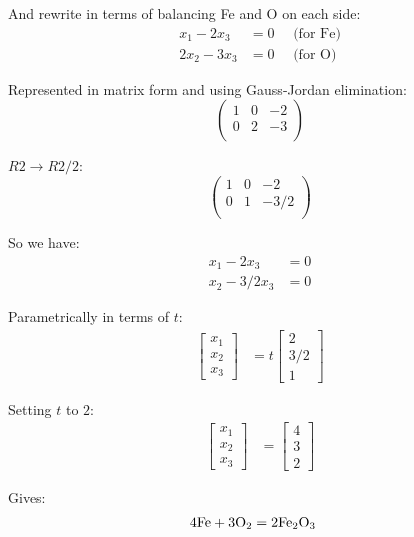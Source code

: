 \documentclass[12pt,a4paper]{report}
\begin{document}
And rewrite in terms of balancing Fe and O on each side:
\begin{align*}
x_1 - 2x_3 &= 0 \quad \text{ (for Fe)}\\
2x_2 - 3x_3 &= 0 \quad \text{ (for O)}
\end{align*} 

Represented in matrix form and using Gauss-Jordan elimination:
 \[
 \left(\begin{array}{rrr}
   1 & 0 & -2 \\
   0 & 2 & -3 \\
   \end{array} \right)
\]

\( R2 \rightarrow R2/2 \):
 \[
 \left(\begin{array}{rrr}
   1 & 0 & -2 \\
   0 & 1 & -3/2 \\
   \end{array} \right)
\]

So we have:
\begin{align*}
x_1 - 2x_3 &= 0 \\
x_2 - 3/2x_3 &= 0
\end{align*} 

Parametrically in terms of \(t\):
\begin{align*}
\begin{bmatrix}x_1\\x_2\\x_3\end{bmatrix} &= t \begin{bmatrix}2\\3/2\\1\end{bmatrix}
\end{align*} 

Setting \(t\) to \(2\):
\begin{align*}
\begin{bmatrix}x_1\\x_2\\x_3\end{bmatrix} &= \begin{bmatrix}4\\3\\2\end{bmatrix}
\end{align*} 

Gives:
\begin{align*}
4\text{Fe} + 3\text{O\textsubscript{2}} &= 2\text{Fe\textsubscript{2}O\textsubscript{3}}
\end{align*} 
\end{document}
